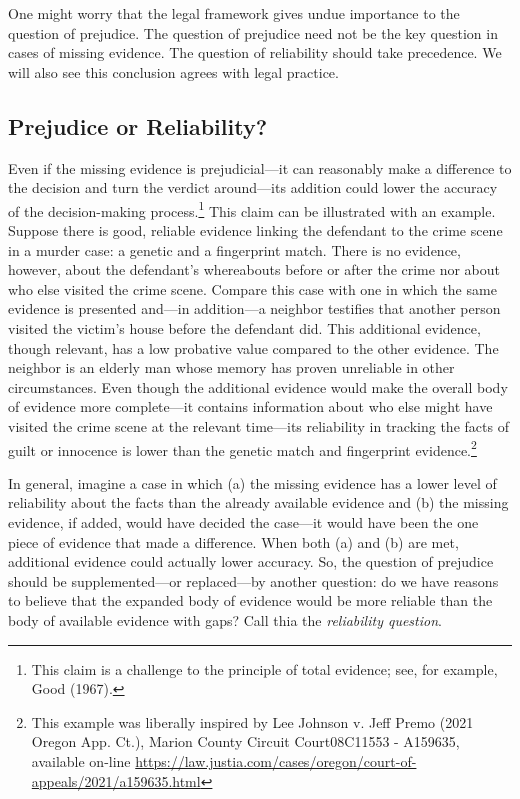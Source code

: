 \documentclass[
  10pt,
  dvipsnames,enabledeprecatedfontcommands]{scrartcl}
\begin{document}
\label{sec:prejudice-reliability} One might worry that the legal
framework gives undue importance to the question of prejudice. The
question of prejudice need not be the key question in cases of missing
evidence. The question of reliability should take precedence. We will
also see this conclusion agrees with legal practice.

\hypertarget{prejudice-or-reliability}{%
\subsection{Prejudice or Reliability?}\label{prejudice-or-reliability}}

Even if the missing evidence is prejudicial---it can reasonably make a
difference to the decision and turn the verdict around---its addition
could lower the accuracy of the decision-making process.\footnote{This
  claim is a challenge to the principle of total evidence; see, for
  example, Good (1967).} This claim can be illustrated with an example.
Suppose there is good, reliable evidence linking the defendant to the
crime scene in a murder case: a genetic and a fingerprint match. There
is no evidence, however, about the defendant's whereabouts before or
after the crime nor about who else visited the crime scene. Compare this
case with one in which the same evidence is presented and---in
addition---a neighbor testifies that another person visited the victim's
house before the defendant did. This additional evidence, though
relevant, has a low probative value compared to the other evidence. The
neighbor is an elderly man whose memory has proven unreliable in other
circumstances. Even though the additional evidence would make the
overall body of evidence more complete---it contains information about
who else might have visited the crime scene at the relevant time---its
reliability in tracking the facts of guilt or innocence is lower than
the genetic match and fingerprint evidence.\footnote{This example was
  liberally inspired by Lee Johnson v. Jeff Premo (2021 Oregon App.
  Ct.), Marion County Circuit Court08C11553 - A159635, available on-line
  \url{https://law.justia.com/cases/oregon/court-of-appeals/2021/a159635.html}}

In general, imagine a case in which (a) the missing evidence has a lower
level of reliability about the facts than the already available evidence
and (b) the missing evidence, if added, would have decided the case---it
would have been the one piece of evidence that made a difference. When
both (a) and (b) are met, additional evidence could actually lower
accuracy. So, the question of prejudice should be supplemented---or
replaced---by another question: do we have reasons to believe that the
expanded body of evidence would be more reliable than the body of
available evidence with gaps? Call thia the
\textit{reliability question}.
\end{document}
